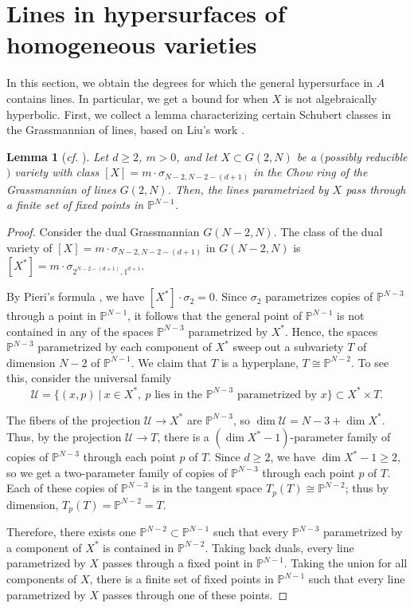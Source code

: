\documentclass[10pt,a4paper]{article}
\numberwithin{equation}{section}
\newtheorem{lemma}[theorem]{Lemma}
\theoremstyle{definition}
\theoremstyle{remark}
\renewcommand{\P}{\mathbb{P}}
\begin{document}
\section{Lines in hypersurfaces of homogeneous varieties}\label{sec4}

In this section, we obtain the degrees for which the general hypersurface in $A$ contains lines. In particular, we get a bound for when $X$ is not algebraically hyperbolic. First, we collect a lemma characterizing certain Schubert classes in the Grassmannian of lines, based on Liu's work \cite{Liu22}.

\begin{lemma}[\textit{cf.} {\cite[Proposition 3.1]{Liu22}}]\label{Schublemma}
    Let $d\ge 2$, $m>0$, and let $X\subset G(2,N)$ be a $($possibly reducible$)$ variety with class $[X] = m\cdot \sigma_{N-2, N-2-(d+1)}$ in the Chow ring of the Grassmannian of lines $G(2,N)$. Then, the lines parametrized by $X$ pass through a finite set of fixed points in $\P^{N-1}$.
\end{lemma}

\begin{proof}
  Consider the dual Grassmannian $G(N-2,N)$. The class of the dual variety of 
  $[X]=m\cdot \sigma_{N-2, N-2-(d+1)}$ in $G(N-2,N)$ is $[X^*]=m\cdot \sigma_{2^{N-2-(d+1)}, 1^{d+1}}$.

    By Pieri's formula \cite[Proposition 4.9]{3264}, we have $[X^*]\cdot \sigma_2 = 0$. Since $\sigma_2$ parametrizes copies of $\P^{N-3}$ through a point in $\P^{N-1}$, it follows that the general point of $\P^{N-1}$ is not contained in any of the spaces $\P^{N-3}$ parametrized by $X^*$. Hence, the spaces $\P^{N-3}$ parametrized by each component of $X^*$ sweep out a subvariety $T$ of dimension $N-2$ of $\P^{N-1}$. We claim that $T$ is a hyperplane, $T\cong \P^{N-2}$. To see this, consider the universal family
    \[ \mathcal{U} = \{ (x, p) \ | \ x\in X^*, \ p \text{ lies in the } \P^{N-3} \text{ parametrized by } x \}\subset X^*\times T. \]

    The fibers of the projection $\mathcal{U}\to X^*$ are $\P^{N-3}$, so $\dim \mathcal{U}=N-3+\dim X^*$. Thus, by the projection $\mathcal{U}\to T$, there is a $(\dim X^*-1)$-parameter family of copies of $\P^{N-3}$ through each point $p$ of $T$. Since $d\ge 2$, we have $\dim X^*-1\ge 2$, so we get a two-parameter family of copies of $\P^{N-3}$ through each point $p$ of $T$. Each of these copies of $\P^{N-3}$ is in the tangent space $T_p(T)\cong \P^{N-2}$; thus by dimension, $T_p(T)=\P^{N-2}=T$.

    Therefore, there exists one $\P^{N-2}\subset \P^{N-1}$ such that every $\P^{N-3}$ parametrized by a component of $X^*$ is contained in $\P^{N-2}$. Taking back duals, every line parametrized by $X$ passes through a fixed point in $\P^{N-1}$. Taking the union for all components of $X$, there is a finite set of fixed points in $\P^{N-1}$ such that every line parametrized by $X$ passes through one of these points.
\end{proof}
\end{document}
